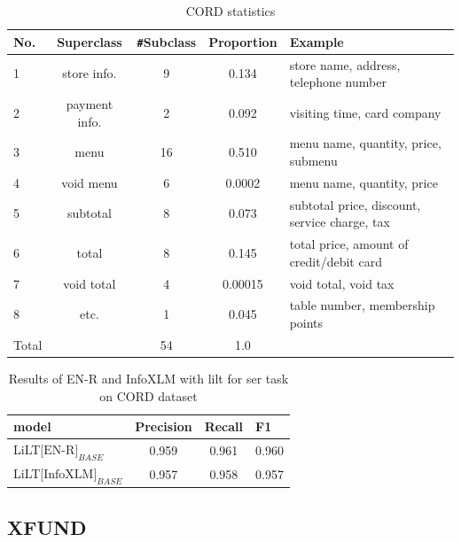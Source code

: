 \begin{table}[!ht]
    \centering
    \begin{tabular}{lcccl}
    \hline
         No.& Superclass & \verb|#|Subclass & Proportion & Example  \\ \toprule
         1 & store info. & 9 & 0.134 & store name, address, telephone number \\
         2 & payment info. & 2 & 0.092 & visiting time, card company \\
         3 & menu & 16 & 0.510 & menu name, quantity, price, submenu \\
         4 & void menu & 6 & 0.0002 & menu name, quantity, price \\
         5 & subtotal & 8 & 0.073 & subtotal price, discount, service charge, tax\\
         6 & total & 8 & 0.145 & total price, amount of credit/debit card\\
         7 & void total & 4 & 0.00015 & void total, void tax\\
         8 & etc. & 1 & 0.045 & table number, membership points \\
         \hline
         Total & &54&1.0 & \\ \bottomrule
    \end{tabular}
    \caption{CORD\cite{park2019cord} statistics}
    \label{tab:CORD_statistics}
\end{table}


\begin{table}[!ht]
    \centering
    \captionsetup{justification=centering}
    \begin{tabular}{lccl}
    \hline
        \textbf{model} & \textbf{Precision} & \textbf{Recall} & \textbf{F1}  \\ \toprule
         
         LiLT\(\text{[EN-R]}_{BASE}\) &  0.959&  0.961& 0.960 \\
         LiLT\(\text{[InfoXLM]}_{BASE}\) & 0.957 & 0.958 & 0.957 \\ \bottomrule
    \end{tabular}
    \caption{Results of EN-R and InfoXLM with \acrshort{lilt} for \acrfull{ser} task on CORD \cite{park2019cord} dataset}
    \label{tab:cord_model_comparision}
\end{table}


\subsection{XFUND}

